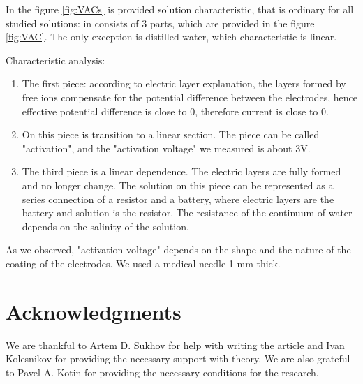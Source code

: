\documentclass{article}
\begin{document}
In the figure \ref{fig:VACs} is provided solution characteristic, that is ordinary for all studied solutions: in consists of 3 parts, which are provided in the figure \ref{fig:VAC}. The only exception is distilled water, which characteristic is linear.

Characteristic analysis:
\begin{enumerate}   
\item The first piece: according to electric layer explanation, the layers formed by free ions compensate for the potential difference between the electrodes, hence effective potential difference is close to 0, therefore current is close to 0.

\item On this piece is transition to a linear section. The piece can be called "activation", and the "activation voltage" we measured is about 3V.

\item The third piece is a linear dependence. The electric layers are fully formed and no longer change. The solution on this piece can be represented as a series connection of a resistor and a battery, where electric layers are the battery and solution is the resistor. The resistance of the continuum of water depends on the salinity of the solution.
\end{enumerate}

As we observed, "activation voltage" depends on the shape and the nature of the coating of the electrodes. We used a medical needle 1 mm thick.



\section{Acknowledgments}
We are thankful to Artem D. Sukhov for help with writing the article and Ivan Kolesnikov for providing the necessary support with theory. We are also grateful to Pavel A. Kotin for providing the necessary conditions for the research.



\end{document}
